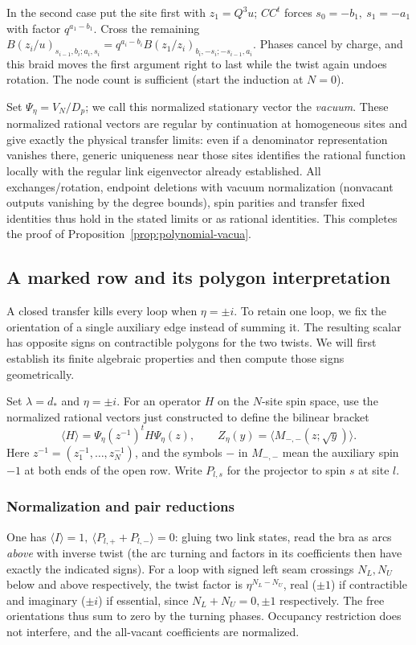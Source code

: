 In the second case put the site first with \(z_1=Q^3u\); \(CC^t\) forces \(s_0=-b_1,\ s_1=-a_1\) with factor \(q^{a_1-b_1}\). Cross the remaining
\(B(z_i/u)_{s_{i-1},b_i;a_i,s_i}=q^{a_i-b_i}B(z_1/z_i)_{b_i,-s_i;-s_{i-1},a_i}\).
Phases cancel by charge, and this braid moves the first argument right to last while the twist again undoes rotation. The node count is sufficient (start the induction at \(N=0\)).

Set \(\Psi_\eta=V_N/D_p\); we call this normalized stationary vector the
\emph{vacuum}. These normalized rational vectors are regular by continuation at homogeneous sites and give exactly the physical transfer limits: even if a denominator representation vanishes there, generic uniqueness near those sites identifies the rational function locally with the regular link eigenvector already established. All exchanges/rotation, endpoint deletions with vacuum normalization (nonvacant outputs vanishing by the degree bounds), spin parities and transfer fixed identities thus hold in the stated limits or as rational identities.
This completes the proof of Proposition~\ref{prop:polynomial-vacua}.

\subsection{A marked row and its polygon interpretation}\label{c4:marked-row}

A closed transfer kills every loop when $\eta=\pm i$. To retain one loop,
we fix the orientation of a single auxiliary edge instead of summing it.
The resulting scalar has opposite signs on contractible polygons for the
two twists. We will first establish its finite algebraic properties and
then compute those signs geometrically.

Set \(\lambda=d_*\) and \(\eta=\pm i\). For an operator $H$ on the
$N$-site spin space, use the normalized rational vectors just constructed
to define the bilinear bracket
\[
 \langle H\rangle=\Psi_\eta(z^{-1})^t H\Psi_\eta(z),\qquad
 Z_\eta(y)=\langle M_{-,-}(z;\sqrt y)\rangle.
\]
Here $z^{-1}=(z_1^{-1},\ldots,z_N^{-1})$, and the symbols $-$ in
$M_{-,-}$ mean the auxiliary spin $-1$ at both ends of the open row.
Write \(P_{l,s}\) for the projector to spin \(s\) at site $l$.

\subsubsection{Normalization and pair reductions}
 One has \(\langle I\rangle=1,\ \langle P_{l,+}+P_{l,-}\rangle=0\): gluing two link states, read the bra as arcs \emph{above} with inverse twist (the arc turning and factors in its coefficients then have exactly the indicated signs). For a loop with signed left seam crossings \(N_L,N_U\) below and above respectively, the twist factor is \(\eta^{N_L-N_U}\), real (\(\pm1\)) if contractible and imaginary (\(\pm i\)) if essential, since \(N_L+N_U=0,\pm1\) respectively. The free orientations thus sum to zero by the turning phases. Occupancy restriction does not interfere, and the all-vacant coefficients are normalized.

